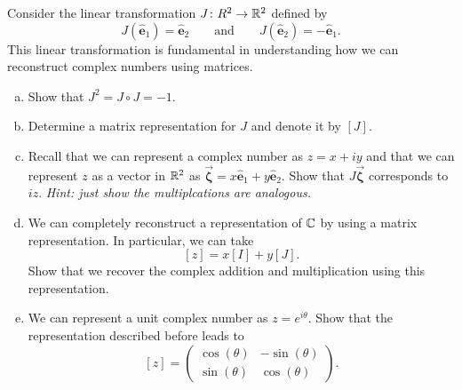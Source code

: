 \documentclass[12pt]{article} %
\newcommand{\ehat}{\boldsymbol{\hat{e}}}
\begin{document}
\newpage
\begin{problem}
Consider the linear transformation $J \colon R^2 \to \mathbb{R}^2$ defined by
\[
J(\ehat_1) = \ehat_2 \qquad \textrm{and} \qquad J(\ehat_2) = -\ehat_1.
\]
This linear transformation is fundamental in understanding how we can reconstruct complex numbers using matrices.
\begin{enumerate}[(a)]
    \item Show that $J^2 = J\circ J= -1$.
    \item Determine a matrix representation for $J$ and denote it by $[J]$.
    \item Recall that we can represent a complex number as $z=x + iy$ and that we can represent $z$ as a vector in $\mathbb{R}^2$ as $\vec{\boldsymbol{\zeta}} = x\ehat_1 + y\ehat_2$.  Show that $J \vec{\boldsymbol{\zeta}}$ corresponds to $iz$. \emph{Hint: just show the multiplcations are analogous.}
    \item We can completely reconstruct a representation of $\mathbb{C}$ by using a matrix representation.  In particular, we can take
    \[
        [z] = x [I] + y [J].
    \]
    Show that we recover the complex addition and multiplication using this representation.
    \item We can represent a unit complex number as $z=e^{i\theta}$.  Show that the representation described before leads to
    \[
        [z] = \begin{pmatrix} \cos(\theta) & -\sin(\theta) \\ \sin(\theta) & \cos(\theta) \end{pmatrix}.
    \]
\end{enumerate}
\end{problem}
\end{document}
